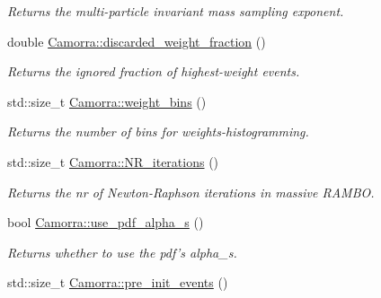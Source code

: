 \begin{DoxyCompactItemize}
\begin{DoxyCompactList}\small\item\em Returns the multi-\/particle invariant mass sampling exponent. \end{DoxyCompactList}\item 
\hypertarget{a00800_a10796df96abe25ecff8b7e25ff14a21b}{
double \hyperlink{a00800_a10796df96abe25ecff8b7e25ff14a21b}{Camorra::discarded\_\-weight\_\-fraction} ()}
\label{a00800_a10796df96abe25ecff8b7e25ff14a21b}

\begin{DoxyCompactList}\small\item\em Returns the ignored fraction of highest-\/weight events. \end{DoxyCompactList}\item 
\hypertarget{a00800_a412ab190d3943e5c209049473462388c}{
std::size\_\-t \hyperlink{a00800_a412ab190d3943e5c209049473462388c}{Camorra::weight\_\-bins} ()}
\label{a00800_a412ab190d3943e5c209049473462388c}

\begin{DoxyCompactList}\small\item\em Returns the number of bins for weights-\/histogramming. \end{DoxyCompactList}\item 
\hypertarget{a00800_a26ad4e0b5a59c164e61f5abfec49b85f}{
std::size\_\-t \hyperlink{a00800_a26ad4e0b5a59c164e61f5abfec49b85f}{Camorra::NR\_\-iterations} ()}
\label{a00800_a26ad4e0b5a59c164e61f5abfec49b85f}

\begin{DoxyCompactList}\small\item\em Returns the nr of Newton-\/Raphson iterations in massive RAMBO. \end{DoxyCompactList}\item 
\hypertarget{a00800_a48798cc08aaebcd575365d42bf1a8dc6}{
bool \hyperlink{a00800_a48798cc08aaebcd575365d42bf1a8dc6}{Camorra::use\_\-pdf\_\-alpha\_\-s} ()}
\label{a00800_a48798cc08aaebcd575365d42bf1a8dc6}

\begin{DoxyCompactList}\small\item\em Returns whether to use the pdf's alpha\_\-s. \end{DoxyCompactList}\item 
\hypertarget{a00800_acb5e5f827904dec106266f7d2d1b1fba}{
std::size\_\-t \hyperlink{a00800_acb5e5f827904dec106266f7d2d1b1fba}{Camorra::pre\_\-init\_\-events} ()}
\label{a00800_acb5e5f827904dec106266f7d2d1b1fba}


\end{DoxyCompactItemize}
